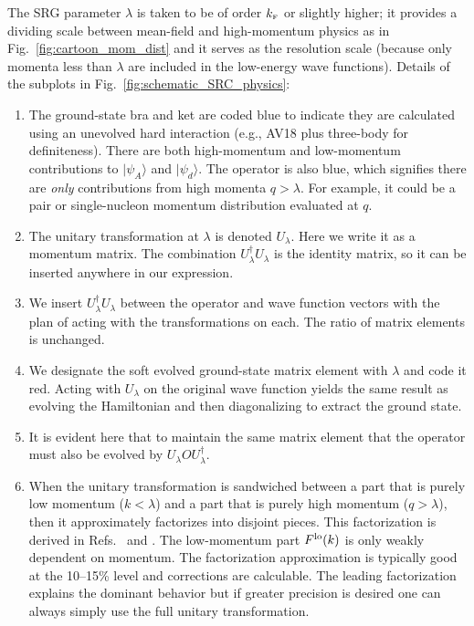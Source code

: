 \documentclass[10pt,aps,prc,floatfix,twocolumn,nofootinbib]{revtex4-1}
\begin{document}
The SRG parameter $\lambda$ is taken to be of order $k_{\scriptscriptstyle{\text F}}$ or slightly higher; it provides a dividing scale between mean-field and high-momentum physics as in Fig.~\ref{fig:cartoon_mom_dist} and it serves as the resolution scale (because only momenta less than $\lambda$ are included in the low-energy wave functions).
Details of the subplots in Fig.~\ref{fig:schematic_SRC_physics}:
\begin{enumerate}
    \renewcommand{\theenumi}{\alph{enumi}}
    
    \item The ground-state bra and ket are coded blue to indicate they are calculated using an unevolved hard interaction (e.g., AV18 plus three-body for definiteness). 
    There are both high-momentum and low-momentum contributions to $|\psi_A\rangle$ and $|\psi_d\rangle$.
    The operator is also blue, which signifies there are \emph{only} contributions from high momenta $q > \lambda$.
    For example, it could be a pair or single-nucleon momentum distribution evaluated at $q$.
    
    \item The unitary transformation at $\lambda$ is denoted $U_\lambda$. 
    Here we write it as a momentum matrix. 
    The combination $U_\lambda^\dagger U_\lambda$ is the identity matrix, so it can be inserted anywhere in our expression.
    
    \item We insert $U_\lambda^\dagger U_\lambda$ between the operator and wave function vectors with the plan of acting with the transformations on each.
    The ratio of matrix elements is unchanged.
    
    \item We designate the soft evolved ground-state matrix element with $\lambda$ and code it red. 
    Acting with $U_\lambda$ on the original wave function yields the same result as evolving the Hamiltonian and then diagonalizing to extract the ground state.
    
    \item It is evident here that to maintain the same matrix element that the operator must also be evolved by $U_\lambda O U_\lambda^\dagger$.
    
    \item When the unitary transformation is sandwiched between a part that is purely low momentum ($k < \lambda$) and a part that is purely high momentum ($q > \lambda$), then it approximately factorizes into disjoint pieces.
    This factorization is derived in Refs.~\cite{Anderson:2010aq} and \cite{Bogner:2012zm}. 
    The low-momentum part $F^{\rm lo}(k)$ is only weakly dependent on momentum.
    The factorization approximation is typically good at the 10--15\% level and corrections are calculable. 
    The leading factorization explains the dominant behavior but if greater precision is desired one can always simply use the full unitary transformation.
    

\end{enumerate}
\end{document}
